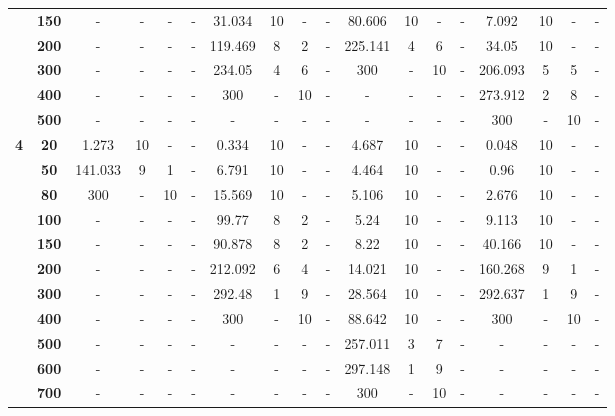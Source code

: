 \documentclass[12pt]{article}
\begin{document}
\begin{table}[h]
\begin{tabular}{cccccccccccccccccc}
          & \textbf{150} & -     & -     & -     & -     & 31.034 & 10    & -     & -     & 80.606 & 10    & -     & -     & 7.092 & 10    & -     & - \\
          & \textbf{200} & -     & -     & -     & -     & 119.469 & 8     & 2     & -     & 225.141 & 4     & 6     & -     & 34.05 & 10    & -     & - \\
          & \textbf{300} & -     & -     & -     & -     & 234.05 & 4     & 6     & -     & 300   & -     & 10    & -     & 206.093 & 5     & 5     & - \\
          & \textbf{400} & -     & -     & -     & -     & 300   & -     & 10    & -     & -     & -     & -     & -     & 273.912 & 2     & 8     & - \\
          & \textbf{500} & -     & -     & -     & -     & -     & -     & -     & -     & -     & -     & -     & -     & 300   & -     & 10    & - \\
    \midrule
    \multirow{10}[2]{*}{\textbf{4}} & \textbf{20} & 1.273 & 10    & -     & -     & 0.334 & 10    & -     & -     & 4.687 & 10    & -     & -     & 0.048 & 10    & -     & - \\
          & \textbf{50} & 141.033 & 9     & 1     & -     & 6.791 & 10    & -     & -     & 4.464 & 10    & -     & -     & 0.96  & 10    & -     & - \\
          & \textbf{80} & 300   & -     & 10    & -     & 15.569 & 10    & -     & -     & 5.106 & 10    & -     & -     & 2.676 & 10    & -     & - \\
          & \textbf{100} & -     & -     & -     & -     & 99.77 & 8     & 2     & -     & 5.24  & 10    & -     & -     & 9.113 & 10    & -     & - \\
          & \textbf{150} & -     & -     & -     & -     & 90.878 & 8     & 2     & -     & 8.22  & 10    & -     & -     & 40.166 & 10    & -     & - \\
          & \textbf{200} & -     & -     & -     & -     & 212.092 & 6     & 4     & -     & 14.021 & 10    & -     & -     & 160.268 & 9     & 1     & - \\
          & \textbf{300} & -     & -     & -     & -     & 292.48 & 1     & 9     & -     & 28.564 & 10    & -     & -     & 292.637 & 1     & 9     & - \\
          & \textbf{400} & -     & -     & -     & -     & 300   & -     & 10    & -     & 88.642 & 10    & -     & -     & 300   & -     & 10    & - \\
          & \textbf{500} & -     & -     & -     & -     & -     & -     & -     & -     & 257.011 & 3     & 7     & -     & -     & -     & -     & - \\
          & \textbf{600} & -     & -     & -     & -     & -     & -     & -     & -     & 297.148 & 1     & 9     & -     & -     & -     & -     & - \\
          & \textbf{700} & -     & -     & -     & -     & -     & -     & -     & -     & 300   & -     & 10    & -     & -     & -     & -     & - \\
    \bottomrule
    \end{tabular}%
  \label{tab:addlabel}%
\end{table}%
\end{document}
